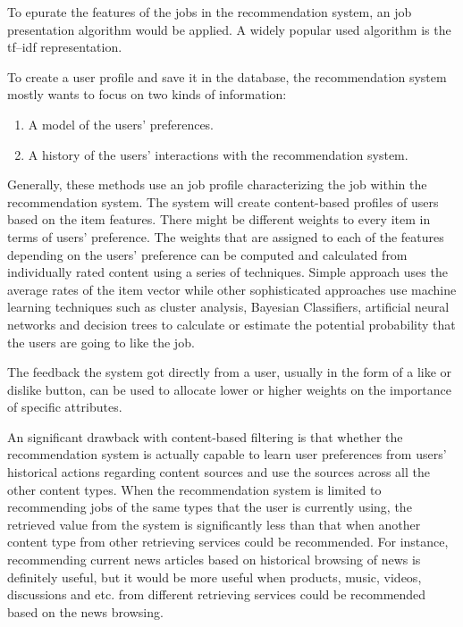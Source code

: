 \documentclass[sigconf]{acmart}
\begin{document}
\par To epurate the features of the jobs in the recommendation system, an job presentation algorithm would be applied. A widely popular used algorithm is the tf–idf representation.

\par To create a user profile and save it in the database, the recommendation system mostly wants to focus on two kinds of information:
\begin{enumerate}
  \item A model of the users' preferences.
  \item A history of the users' interactions with the recommendation system.
\end{enumerate}

\par Generally, these methods use an job profile characterizing the job within the recommendation system. The system will create content-based profiles of users based on the item features. There might be different weights to every item in terms of users' preference. The weights that are assigned to each of the features depending on the users' preference can be computed and calculated from individually rated content using a series of techniques.\cite{Standford} Simple approach uses the average rates of the item vector while other sophisticated approaches use machine learning techniques such as cluster analysis, Bayesian Classifiers, artificial neural networks and decision trees to calculate or estimate the potential probability that the users are going to like the job.\cite{Standford}

\par The feedback the system got directly from a user, usually in the form of a like or dislike button, can be used to allocate lower or higher weights on the importance of specific attributes.

\par An significant drawback with content-based filtering is that whether the recommendation system is actually capable to learn user preferences from users' historical actions regarding content sources and use the sources across all the other content types.\cite{Zhou2017} When the recommendation system is limited to recommending jobs of the same types that the user is currently using, the retrieved value from the system is significantly less than that when another content type from other retrieving services could be recommended.\cite{Standford} For instance, recommending current news articles based on historical browsing of news is definitely useful, but it would be more useful when products, music, videos, discussions and etc. from different retrieving services could be recommended based on the news browsing.
\end{document}
